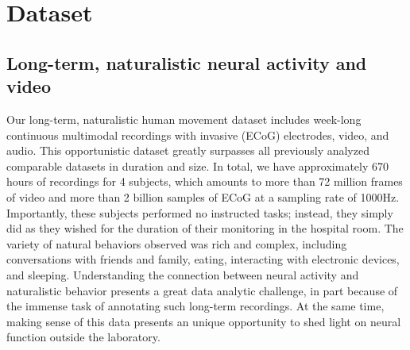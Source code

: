 \documentclass[letterpaper]{article} %
\begin{document}

%
\section{Dataset}


\subsection{Long-term, naturalistic neural activity and video}

Our long-term, naturalistic human movement dataset includes week-long continuous multimodal recordings with invasive (ECoG) electrodes, video, and audio.
This opportunistic dataset greatly surpasses all previously analyzed comparable datasets in duration and size.
In total, we have approximately 670 hours of recordings for 4 subjects, which amounts to more than 72 million frames of video and more than 2 billion samples of ECoG at a sampling rate of 1000Hz. 
Importantly, these subjects performed no instructed tasks; instead, they simply did as they wished for the duration of their monitoring in the hospital room.
The variety of natural behaviors observed was rich and complex, including conversations with friends and family, eating, interacting with electronic devices, and sleeping.
Understanding the connection between neural activity and naturalistic behavior presents a great data analytic challenge, in part because of the immense task of annotating such long-term recordings.
At the same time, making sense of this data presents an unique opportunity to shed light on neural function outside the laboratory.
%
\end{document}
